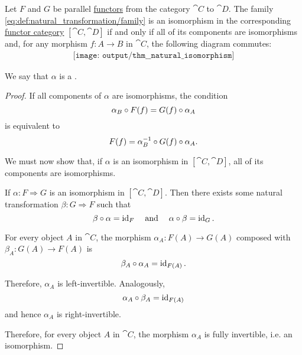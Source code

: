 \begin{proposition}\label{thm:natural_isomorphism}
  Let \( F \) and \( G \) be parallel \hyperref[def:functor]{functors} from the category \( \cat{C} \) to \( \cat{D} \). The family \eqref{eq:def:natural_transformation/family} is an isomorphism in the corresponding \hyperref[def:functor_category]{functor category} \( [\cat{C}, \cat{D}] \) if and only if all of its components are isomorphisms and, for any morphism \( f: A \to B \) in \( \cat{C} \), the following diagram commutes:
  \begin{equation}\label{eq:thm:natural_isomorphism/diagram}
    \begin{aligned}
      \texttt{[image: output/thm\_\_natural\_isomorphism]}
    \end{aligned}
  \end{equation}

  We say that \( \alpha \) is a .
\end{proposition}
\begin{proof}
  If all components of \( \alpha \) are isomorphisms, the condition
  \begin{equation*}
    \alpha_B \bincirc F(f) = G(f) \bincirc \alpha_A
  \end{equation*}
  is equivalent to
  \begin{equation*}
    F(f) = \alpha_B^{-1} \bincirc G(f) \bincirc \alpha_A.
  \end{equation*}

  We must now show that, if \( \alpha \) is an isomorphism in \( [\cat{C}, \cat{D}] \), all of its components are isomorphisms.

  If \( \alpha: F \Rightarrow G \) is an isomorphism in \( [\cat{C}, \cat{D}] \). Then there exists some natural transformation \( \beta: G \Rightarrow F \) such that
  \begin{equation*}
    \beta \bincirc \alpha = \id_F \quad\T{and}\quad \alpha \bincirc \beta = \id_G.
  \end{equation*}

  For every object \( A \) in \( \cat{C} \), the morphism \( \alpha_A: F(A) \to G(A) \) composed with \( \beta_A: G(A) \to F(A) \) is
  \begin{equation*}
    \beta_A \bincirc \alpha_A = \id_{F(A)}.
  \end{equation*}

  Therefore, \( \alpha_A \) is left-invertible. Analogously,
  \begin{equation*}
    \alpha_A \bincirc \beta_A = \id_{F(A)}
  \end{equation*}
  and hence \( \alpha_A \) is right-invertible.

  Therefore, for every object \( A \) in \( \cat{C} \), the morphism \( \alpha_A \) is fully invertible, i.e. an isomorphism.
\end{proof}

